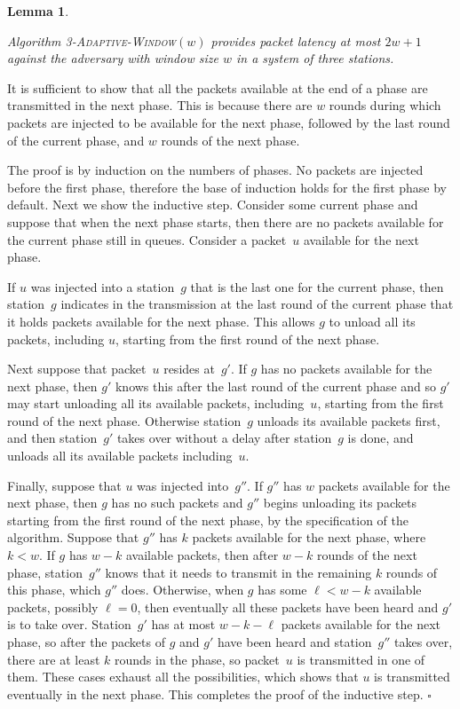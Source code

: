 \documentclass[11pt]{article}
\newcommand{\qed}{\hfill $\square$ \smallbreak}
\newenvironment{proof}{\noindent{\bf Proof:}}{\qed}
\newtheorem{lemma}{Lemma}
\begin{document}

\begin{lemma}
\label{lem:3-adaptive-window-w}

Algorithm \textsc{3-Adaptive-Window$(w)$} provides packet latency at most $2w+1$ against the adversary with window size $w$ in a system of three stations.
\end{lemma}


\begin{proof}
It is sufficient to show that all the packets available at the end of a phase are transmitted in  the next phase.
This is because there are $w$ rounds during which packets are injected to be available for the next phase, followed by the last round of the current phase, and $w$ rounds of the next phase.

The proof is by induction on the numbers of phases.
No packets are injected before the first phase, therefore the base of induction holds for the first phase by default.
Next we show the inductive step.
Consider some current phase and suppose that when the next phase starts, then there are no packets available for the current phase still in queues.
Consider a packet~$u$ available for the next phase.

If $u$ was injected into a station~$g$ that is the last one for the current phase, then station~$g$ indicates in the transmission at the last round of the current phase that it holds packets  available for the next phase.
This allows $g$ to unload all its packets, including $u$, starting from the first round of the next phase.

Next suppose that packet~$u$ resides at~$g'$.
If $g$ has no packets available for the next phase, then $g'$ knows this after the last round of the current phase  and so $g'$ may start unloading all its available packets, including~$u$, starting from the first round of the next phase.
Otherwise station~$g$ unloads its available packets first, and then station~$g'$ takes over without a delay after station~$g$ is done, and unloads all its available packets including~$u$.

Finally, suppose that $u$ was injected into~$g''$.
If $g''$ has $w$ packets available for the next phase, then $g$ has no such packets and $g''$ begins unloading its packets starting from the first round of the next phase, by the specification of the algorithm.
Suppose that $g''$ has $k$ packets available for the next phase, where $k<w$.
If $g$ has $w-k$ available packets, then after $w-k$ rounds of the next phase, station~$g''$ knows that it needs to transmit in the remaining $k$ rounds of this phase, which $g''$ does.
Otherwise, when $g$ has some $\ell<w-k$ available packets, possibly $\ell=0$, then eventually all these packets have been heard and $g'$ is to take over.
Station~$g'$ has at most $w-k-\ell$ packets available for the next phase, so after the packets of $g$ and $g'$ have been heard and station~$g''$ takes over, there are at least $k$ rounds in the phase, so packet~$u$ is transmitted in one of them.
These cases exhaust all the possibilities, which shows that $u$ is transmitted eventually in the next phase.
This completes the proof of the inductive step.
\end{proof}
\end{document}
